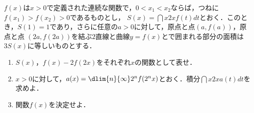 \documentclass[a4j]{jarticle}
\begin{document}

     \begin{oframed}
     $f(x)$は$x>0$で定義された連続な関数で，$0<x_1<x_2$ならば，つねに$f(x_1)>f(x_2)>0$であるものとし，
     $S(x)=\dint{x}{2x}f(t)dt$とおく．このとき，$S(1)=1$であり，さらに任意の$a>0$に対して，原点と点$(a,f(a))$，原点と点
     $(2a,f(2a))$を結ぶ$2$直線と曲線$y=f(x)$とで囲まれる部分の面積は$3S(x)$に等しいものとする．
          \begin{enumerate}[(1)]
          \item $S(x)$，$f(x)-2f(2x)$をそれぞれ$x$の関数として表せ．
          \item $x>0$に対して，$a(x)=\dlim{n}{\infty}2^nf(2^nx)$とおく．積分$\dint{x}{2x}a(t)dt$を求めよ．
          \item 関数$f(x)$を決定せよ．
          \end{enumerate}
     \end{oframed}
\end{document}
